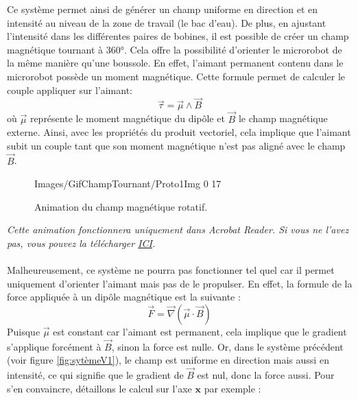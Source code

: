 \documentclass{article}
\begin{document}
\noindent
Ce système permet ainsi de générer un champ uniforme en direction et en intensité au niveau de la zone de travail (le bac d'eau). De plus, en ajustant l'intensité dans les différentes paires de bobines, il est possible de créer un champ magnétique tournant à 360°. Cela offre la possibilité d'orienter le microrobot de la même manière qu'une boussole. En effet, l'aimant permanent contenu dans le microrobot possède un moment magnétique. Cette formule \cite{ref4} permet de calculer le couple appliquer sur l'aimant:
    \begin{equation}
      \vec{\tau} = \vec{\mu} \wedge \vec{B}\label{eq:coupleMomentMag}
    \end{equation}
     où $\vec{\mu}$ représente le moment magnétique du dipôle et $\vec{B}$ le champ magnétique externe. Ainsi, avec les propriétés du produit vectoriel, cela implique que l'aimant subit un couple tant que son moment magnétique n'est pas aligné avec le champ $\vec{B}$.

    \begin{figure}[H]
        \centering
        {Images/GifChampTournant/Proto1Img}%
        {0}%
        {17}%
        \caption{Animation du champ magnétique rotatif.}


        \label{fig:my_label}
    \end{figure}
    {\small\itshape\color{gray} Cette animation fonctionnera uniquement dans Acrobat Reader. Si vous ne l'avez pas, vous pouvez la télécharger \href{https://drive.google.com/file/d/1W6Fok3klrCoOXPwF3TfWwfjug8hkEbIQ/view?usp=drive_link}{ICI}.}
    \\\\
    Malheureusement, ce système ne pourra pas fonctionner tel quel car il permet uniquement d'orienter l'aimant mais pas de le propulser. En effet, la formule de la force appliquée à un dipôle magnétique \cite{ref4} est la suivante :
    \begin{equation}
      \vec{F} = \vec{\nabla} (\vec{\mu} \cdot \vec{B}) \label{eq:ForceMag}
    \end{equation}
    \noindent
    Puisque $\vec{\mu}$ est constant car l'aimant est permanent, cela implique que le gradient s'applique forcément à $\vec{B}$, sinon la force est nulle. Or, dans le système précédent (voir figure \ref{fig:sytèmeV1}), le champ est uniforme en direction mais aussi en intensité, ce qui signifie que le gradient de $\vec{B}$ est nul, donc la force aussi. Pour s'en convaincre, détaillons le calcul sur l'axe $\mathbf{x}$ par exemple :
    
\end{document}
